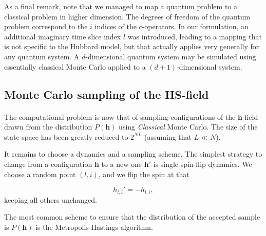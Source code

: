 \documentclass[10pt, twocolumn, twoside]{article}
\begin{document}
As a final remark, note that we managed to map a quantum problem to a classical problem in higher dimension. The degrees of freedom of the quantum problem correspond to the $i$ indices  of the $c$-operators. In our formulation, an additional imaginary time slice index $l$ was introduced, leading to a mapping that is not specific to the Hubbard model, but that actually applies very generally for any quantum system. A $d$-dimensional quantum system may be simulated using essentially classical Monte Carlo applied to a $(d+1)$-dimensional system.

\subsection{Monte Carlo sampling of the HS-field}\paragraph{}

The computational problem is now that of sampling configurations of the $\bm h$ field drawn from the distribution $P(\bm h)$ using \emph{Classical} Monte Carlo. The size of the state space has been greatly reduced to $2^{NL}$ (assuming that $L \ll N$).

It remains to choose a dynamics and a sampling scheme. The simplest strategy to change from a configuration $\bm h$ to a new one $\bm h'$ is single spin-flip dynamics. We choose a random point $(l, i)$, and we flip the spin at that 

\begin{equation}
h_{l, i}' = - h_{l, i},
\end{equation}
keeping all others unchanged.

The most common scheme to ensure that the distribution of the accepted sample is $P(\bm h)$ is the Metropolis-Hastings algorithm.
\end{document}
